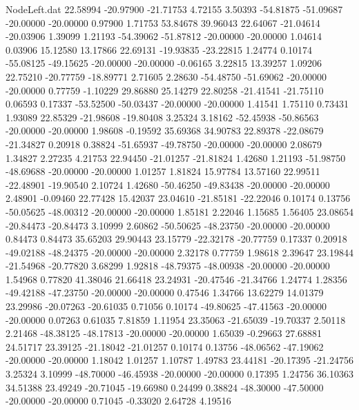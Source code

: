 \begin{filecontents}{NodeLeft.dat}
  22.58994  -20.97900  -21.71753     4.72155    3.50393  -54.81875  -51.09687  -20.00000  -20.00000    0.97900    1.71753   53.84678   39.96043
  22.64067  -21.04614  -20.03906     1.39099    1.21193  -54.39062  -51.87812  -20.00000  -20.00000    1.04614    0.03906   15.12580   13.17866
  22.69131  -19.93835  -23.22815     1.24774    0.10174  -55.08125  -49.15625  -20.00000  -20.00000   -0.06165    3.22815   13.39257    1.09206
  22.75210  -20.77759  -18.89771     2.71605    2.28630  -54.48750  -51.69062  -20.00000  -20.00000    0.77759   -1.10229   29.86880   25.14279
  22.80258  -21.41541  -21.75110     0.06593    0.17337  -53.52500  -50.03437  -20.00000  -20.00000    1.41541    1.75110    0.73431    1.93089
  22.85329  -21.98608  -19.80408     3.25324    3.18162  -52.45938  -50.86563  -20.00000  -20.00000    1.98608   -0.19592   35.69368   34.90783
  22.89378  -22.08679  -21.34827     0.20918    0.38824  -51.65937  -49.78750  -20.00000  -20.00000    2.08679    1.34827    2.27235    4.21753
  22.94450  -21.01257  -21.81824     1.42680    1.21193  -51.98750  -48.69688  -20.00000  -20.00000    1.01257    1.81824   15.97784   13.57160
  22.99511  -22.48901  -19.90540     2.10724    1.42680  -50.46250  -49.83438  -20.00000  -20.00000    2.48901   -0.09460   22.77428   15.42037
  23.04610  -21.85181  -22.22046     0.10174    0.13756  -50.05625  -48.00312  -20.00000  -20.00000    1.85181    2.22046    1.15685    1.56405
  23.08654  -20.84473  -20.84473     3.10999    2.60862  -50.50625  -48.23750  -20.00000  -20.00000    0.84473    0.84473   35.65203   29.90443
  23.15779  -22.32178  -20.77759     0.17337    0.20918  -49.02188  -48.24375  -20.00000  -20.00000    2.32178    0.77759    1.98618    2.39647
  23.19844  -21.54968  -20.77820     3.68299    1.92818  -48.79375  -48.00938  -20.00000  -20.00000    1.54968    0.77820   41.38046   21.66418
  23.24931  -20.47546  -21.34766     1.24774    1.28356  -49.42188  -47.23750  -20.00000  -20.00000    0.47546    1.34766   13.62279   14.01379
  23.29986  -20.07263  -20.61035     0.71056    0.10174  -49.80625  -47.41563  -20.00000  -20.00000    0.07263    0.61035    7.81859    1.11954
  23.35063  -21.65039  -19.70337     2.50118    2.21468  -48.38125  -48.17813  -20.00000  -20.00000    1.65039   -0.29663   27.68881   24.51717
  23.39125  -21.18042  -21.01257     0.10174    0.13756  -48.06562  -47.19062  -20.00000  -20.00000    1.18042    1.01257    1.10787    1.49783
  23.44181  -20.17395  -21.24756     3.25324    3.10999  -48.70000  -46.45938  -20.00000  -20.00000    0.17395    1.24756   36.10363   34.51388
  23.49249  -20.71045  -19.66980     0.24499    0.38824  -48.30000  -47.50000  -20.00000  -20.00000    0.71045   -0.33020    2.64728    4.19516

\end{filecontents}
